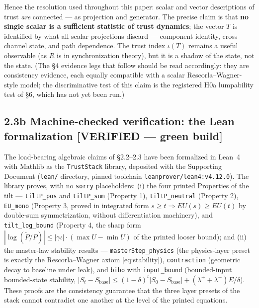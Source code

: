 \documentclass[
]{article}
\begin{document}
Hence the resolution used throughout this paper: scalar and vector
descriptions of trust \emph{are} connected --- as projection and
generator. The precise claim is that \textbf{no single scalar is a
sufficient statistic of trust dynamics}; the vector \(T\) is identified
by what all scalar projections discard --- component identity,
cross-channel state, and path dependence. The trust index \(\iota(T)\)
remains a useful observable (as \(R\) is in synchronization theory), but
it is a shadow of the state, not the state. (The §4 evidence legs that
follow should be read accordingly: they are consistency evidence, each
equally compatible with a scalar Rescorla--Wagner-style model; the
discriminative test of this claim is the registered H0a lumpability test
of §6, which has not yet been run.)

\subsection{2.3b Machine-checked verification: the Lean formalization
{[}VERIFIED --- green
build{]}}\label{b-machine-checked-verification-the-lean-formalization-verified-green-build}

The load-bearing algebraic claims of §2.2--2.3 have been formalized in
Lean~4 with Mathlib as the \texttt{TrustStack} library, deposited with
the Supporting Document (\texttt{lean/} directory, pinned toolchain
\texttt{leanprover/lean4:v4.12.0}). The library proves, with no
\texttt{sorry} placeholders: (i) the four printed Properties of the tilt
--- \texttt{tiltP\_pos} and \texttt{tiltP\_sum} (Property 1),
\texttt{tiltP\_neutral} (Property 2), \texttt{EU\_mono} (Property 3,
proved in integrated form \(s \geq t \Rightarrow EU(s) \geq EU(t)\) by
double-sum symmetrization, without differentiation machinery), and
\texttt{tilt\_log\_bound} (Property 4, the sharp form
\(|\log(\tilde{P}/P)| \leq |\gamma\iota|\cdot(\max U - \min U)\) of the
printed looser bound); and (ii) the master-law stability results ---
\texttt{masterStep\_physics} (the physics-layer preset is exactly the
Rescorla--Wagner axiom {[}eq:stability{]}), \texttt{contraction}
(geometric decay to baseline under leak), and \texttt{bibo} with
\texttt{input\_bound} (bounded-input bounded-state stability,
\(|S_t - S_{\mathrm{base}}| \leq (1-\delta)^t|S_0 - S_{\mathrm{base}}| +
(\lambda^{+}+\lambda^{-})E/\delta\)). These proofs are the consistency
guarantee that the three layer presets of the stack cannot contradict
one another at the level of the printed equations.
\end{document}
